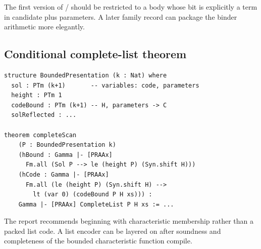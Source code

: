 The first version of / should be restricted to a body whose bit is explicitly a
term in candidate plus parameters.  A later family record can package the binder arithmetic more
elegantly.

\subsection{Conditional complete-list theorem}

\begin{lstlisting}[language=Lean]
structure BoundedPresentation (k : Nat) where
  sol : PTm (k+1)       -- variables: code, parameters
  height : PTm 1
  codeBound : PTm (k+1) -- H, parameters -> C
  solReflected : ...

theorem completeScan
    (P : BoundedPresentation k)
    (hBound : Gamma |- [PRAAx]
      Fm.all (Sol P --> le (height P) (Syn.shift H)))
    (hCode : Gamma |- [PRAAx]
      Fm.all (le (height P) (Syn.shift H) -->
        lt (var 0) (codeBound P H xs))) :
    Gamma |- [PRAAx] CompleteList P H xs := ...
\end{lstlisting}

The report recommends beginning with characteristic membership rather than a packed list code.  A
list encoder can be layered on after soundness and completeness of the bounded characteristic
function compile.
